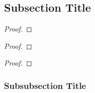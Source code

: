 \lipsum[1]

\subsection{Subsection Title}

\begin{defn}
    \lipsum[1]
\end{defn}

\begin{rmrk}
    \lipsum[1]
\end{rmrk}

\begin{exmp}
    \lipsum[1]
\end{exmp}

\begin{exmp}
    \lipsum[1]
\end{exmp}

\begin{exmp}
    \lipsum[1]
\end{exmp}

\begin{lemm}
    \lipsum[1]
\end{lemm}

\begin{proof}
    \lipsum[1]
\end{proof}

\begin{thrm}
    \lipsum[1]
\end{thrm}

\begin{proof}
    \lipsum[1]
\end{proof}

\begin{coro}
    \lipsum[1]
\end{coro}

\begin{proof}
    \lipsum[1]
\end{proof}

\subsubsection{Subsubsection Title}

\begin{defn}
    \lipsum[1]
\end{defn}

\begin{rmrk}
    \lipsum[1]
\end{rmrk}

